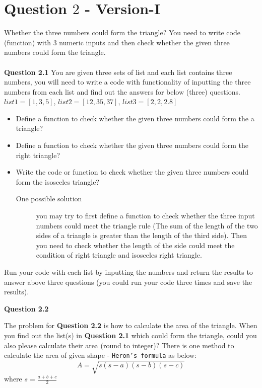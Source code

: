 \documentclass[a4paper]{article}
\begin{document}
    \section{Question $2$ - Version-I}
    
    \begin{answer}
    
    Whether the three numbers could form the triangle? You need to write  code (function) with 3 numeric inputs and then check whether the given three numbers could form the triangle. \\
    \\
    \textbf{Question 2.1}
    You are given three sets of list and each list contains three numbers, you will need to write a code with functionality of inputting the three numbers from each list and find out the answers for below (three) questions.
    $list1 = [1,3,5]$, $list2 = [12,35,37]$, $list3 = [2,2,2.8]$
    \begin{itemize}
        \item Define a function to check whether the given three numbers could form the 
        a triangle?
        \item Define a function to check whether the given three numbers could form the right triangle?

        \item Write the code or function to check whether the given three numbers could form the isosceles triangle?

        \begin{description}
            \item[One possible solution] 
            you may try to first define a function to check whether the three input numbers could meet the triangle rule (The sum of the length of the two sides of a triangle is greater than the length of the third side).
            Then you need to check whether the length of the side could meet the condition of right triangle and isosceles right triangle.
        \end{description}     
    \end{itemize}

    Run your code with each list by inputting the numbers and return the results to answer above three questions (you could run your code three times and save the results).
    
    
    \textbf{Question 2.2}
    
    The problem for \textbf{Question 2.2} is how to calculate the area of the triangle. When you find out the list(s) in \textbf{Question 2.1} which could form the triangle, could you also please calculate their area (round to integer)?
    There is one method to calculate the area of given shape 
    - \texttt{Heron's formula} as below:
   \begin{equation} \label{eq:area}
        A = \sqrt{s(s-a)(s-b)(s-c)}
    \end{equation}
    where $s =  \frac{a+b+c}{2}$\\
    

\end{answer}
\end{document}
